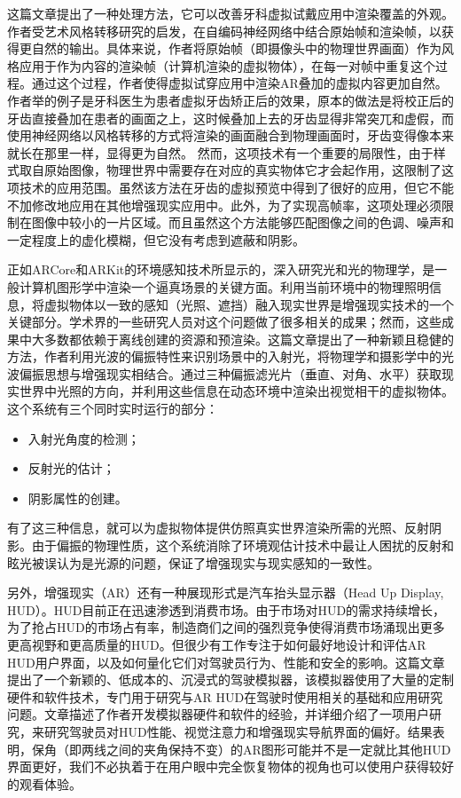 这篇文章\cite{VasSor19}提出了一种处理方法，它可以改善牙科虚拟试戴应用中渲染覆盖的外观。作者受艺术风格转移研究的启发，在自编码神经网络中结合原始帧和渲染帧，以获得更自然的输出。具体来说，作者将原始帧（即摄像头中的物理世界画面）作为风格应用于作为内容的渲染帧（计算机渲染的虚拟物体），在每一对帧中重复这个过程。通过这个过程，作者使得虚拟试穿应用中渲染AR叠加的虚拟内容更加自然。作者举的例子是牙科医生为患者虚拟牙齿矫正后的效果，原本的做法是将校正后的牙齿直接叠加在患者的画面之上，这时候叠加上去的牙齿显得非常突兀和虚假，而使用神经网络以风格转移的方式将渲染的画面融合到物理画面时，牙齿变得像本来就长在那里一样，显得更为自然。
然而，这项技术有一个重要的局限性，由于样式取自原始图像，物理世界中需要存在对应的真实物体它才会起作用，这限制了这项技术的应用范围。虽然该方法在牙齿的虚拟预览中得到了很好的应用，但它不能不加修改地应用在其他增强现实应用中。此外，为了实现高帧率，这项处理必须限制在图像中较小的一片区域。而且虽然这个方法能够匹配图像之间的色调、噪声和一定程度上的虚化模糊，但它没有考虑到遮蔽和阴影。

正如ARCore和ARKit的环境感知技术所显示的，深入研究光和光的物理学，是一般计算机图形学中渲染一个逼真场景的关键方面。利用当前环境中的物理照明信息，将虚拟物体以一致的感知（光照、遮挡）融入现实世界是增强现实技术的一个关键部分。学术界的一些研究人员对这个问题做了很多相关的成果；然而，这些成果中大多数都依赖于离线创建的资源和预渲染。这篇文章\cite{AlhTuc19}提出了一种新颖且稳健的方法，作者利用光波的偏振特性来识别场景中的入射光，将物理学和摄影学中的光波偏振思想与增强现实相结合。通过三种偏振滤光片（垂直、对角、水平）获取现实世界中光照的方向，并利用这些信息在动态环境中渲染出视觉相干的虚拟物体。这个系统有三个同时实时运行的部分：

\begin{itemize}
	\item 入射光角度的检测；
	\item 反射光的估计；
	\item 阴影属性的创建。
\end{itemize}

有了这三种信息，就可以为虚拟物体提供仿照真实世界渲染所需的光照、反射阴影。由于偏振的物理性质，这个系统消除了环境观估计技术中最让人困扰的反射和眩光被误认为是光源的问题，保证了增强现实与现实感知的一致性。

另外，增强现实（AR）还有一种展现形式是汽车抬头显示器（Head Up Display, HUD）。HUD目前正在迅速渗透到消费市场。由于市场对HUD的需求持续增长，为了抢占HUD的市场占有率，制造商们之间的强烈竞争使得消费市场涌现出更多更高视野和更高质量的HUD。但很少有工作专注于如何最好地设计和评估AR HUD用户界面，以及如何量化它们对驾驶员行为、性能和安全的影响。这篇文章\cite{GabSmiTan19}提出了一个新颖的、低成本的、沉浸式的驾驶模拟器，该模拟器使用了大量的定制硬件和软件技术，专门用于研究与AR HUD在驾驶时使用相关的基础和应用研究问题。文章描述了作者开发模拟器硬件和软件的经验，并详细介绍了一项用户研究，来研究驾驶员对HUD性能、视觉注意力和增强现实导航界面的偏好。结果表明，保角（即两线之间的夹角保持不变）的AR图形可能并不是一定就比其他HUD界面更好，我们不必执着于在用户眼中完全恢复物体的视角也可以使用户获得较好的观看体验。

